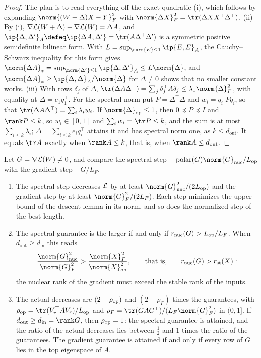 \begin{refsection}
\begin{proof}
The plan is to read everything off the exact quadratic (i), which follows by expanding $\norm{(W+\Delta)X-Y}_F^2$ with $\norm{\Delta X}_F^2=\tr(\Delta XX^\top\Delta^\top)$. (ii) By (i), $\nabla\mathcal{L}(W+\Delta)-\nabla\mathcal{L}(W)=\Delta A$, and $\ip{\Delta,\Delta'}_A\defeq\ip{\Delta A,\Delta'}=\tr(A\Delta^\top\Delta')$ is a symmetric positive semidefinite bilinear form. With $L=\sup_{\norm{E}\le1}\ip{E,E}_A$, the Cauchy--Schwarz inequality for this form gives $\norm{\Delta A}_*=\sup_{\norm{\Delta'}\le1}\ip{\Delta,\Delta'}_A\le L\norm{\Delta}$, and $\norm{\Delta A}_*\ge\ip{\Delta,\Delta}_A/\norm{\Delta}$ for $\Delta\ne0$ shows that no smaller constant works. (iii) With rows $\delta_j$ of $\Delta$, $\tr(\Delta A\Delta^\top)=\sum_j\delta_j^\top A\delta_j\le\lambda_1\norm{\Delta}_F^2$, with equality at $\Delta=e_1q_1^\top$. For the spectral norm put $P=\Delta^\top\Delta$ and $w_i=q_i^\top Pq_i$, so that $\tr(\Delta A\Delta^\top)=\sum_i\lambda_iw_i$. If $\norm{\Delta}_{\op}\le1$, then $0\preceq P\preceq I$ and $\rank P\le k$, so $w_i\in[0,1]$ and $\sum_iw_i=\tr P\le k$, and the sum is at most $\sum_{i\le k}\lambda_i$; $\Delta=\sum_{i\le k}e_iq_i^\top$ attains it and has spectral norm one, as $k\le d_{\mathrm{out}}$. It equals $\tr A$ exactly when $\rank A\le k$, that is, when $\rank A\le d_{\mathrm{out}}$.
\end{proof}

\begin{theorem}\label{thm:spectral:whenhelps}
Let $G=\nabla\mathcal{L}(W)\ne0$, and compare the spectral step $-\polar(G)\norm{G}_{\nuc}/L_{\op}$ with the gradient step $-G/L_F$.
\begin{enumerate}
\item The spectral step decreases $\mathcal{L}$ by at least $\norm{G}_{\nuc}^2/(2L_{\op})$ and the gradient step by at least $\norm{G}_F^2/(2L_F)$. Each step minimizes the upper bound of the descent lemma in its norm, and so does the normalized step of the best length.
\item The spectral guarantee is the larger if and only if $r_{\mathrm{nuc}}(G)>L_{\mathrm{op}}/L_F$. When $d_{\mathrm{out}}\ge d_{\mathrm{in}}$ this reads
\[
  \frac{\norm{G}_{\nuc}^2}{\norm{G}_F^2}>\frac{\norm{X}_F^2}{\norm{X}_{\op}^2},\qquad\text{that is,}\qquad\spectralrnuc(G)>\spectralrst(X):
\]
the nuclear rank of the gradient must exceed the stable rank of the inputs.
\item The actual decreases are $(2-\rho_{\mathrm{op}})$ and $(2-\rho_F)$ times the guarantees, with $\rho_{\op}=\tr(V_r^\top AV_r)/L_{\op}$ and $\rho_F=\tr(GAG^\top)/(L_F\norm{G}_F^2)$ in $(0,1]$. If $d_{\mathrm{out}}\ge d_{\mathrm{in}}=\rank G$, then $\rho_{\mathrm{op}}=1$: the spectral guarantee is attained, and the ratio of the actual decreases lies between $\frac12$ and $1$ times the ratio of the guarantees. The gradient guarantee is attained if and only if every row of $G$ lies in the top eigenspace of $A$.
\end{enumerate}
\end{theorem}


\end{refsection}
